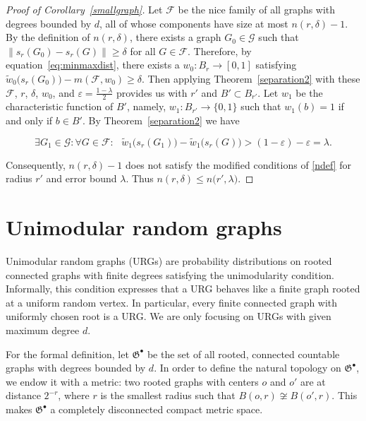 \documentclass[12pt,a4paper]{article}
\newcommand{\eps}{\varepsilon}
\newcommand{\F}{\mathcal{F}}
\newcommand{\G}{\mathcal{G}}
\renewcommand{\:}{\colon}
\begin{document}
\begin{proof}[Proof of Corollary~\ref{smallgraph}]
Let $\F$ be the nice family of all graphs with degrees bounded by $d$, all of whose components have size at most $n(r, \delta) - 1$. 
By the definition of $n(r, \delta)$, there exists a graph $G_0 \in \G$ such that $\big\| s_r(G_0)-s_r(G)\big\|\geq \delta$ for all $G\in \F$. 
Therefore, by equation~\eqref{eq:minmaxdist}, there exists a $w_0\: B_r \rightarrow [0, 1]$ satisfying $\tilde{w}_0\big(s_r(G_0)\big) - m(\F, w_0) \ge \delta$. 
Then applying Theorem~\ref{separation2} with these $\F$, $r$, $\delta$, $w_0$, and $\eps = \frac{1 - \lambda}{2}$ provides us with $r'$ and $B' \subset B_{r'}$. 
Let $w_1$ be the characteristic function of $B'$, namely, $w_1: B_{r'} \rightarrow \{0, 1\}$ such that $w_1(b) = 1$ if and only if $b \in B'$. 
By Theorem~\ref{separation2} we have

$$\exists G_1 \in \G \: \forall G \in \F \: \,\,\,\, \tilde{w}_1\big(s_r(G_1)\big) - \tilde{w}_1\big(s_r(G)\big) > (1 - \eps) - \eps = \lambda.$$ 

Consequently, $n(r, \delta) - 1$ does not satisfy the modified conditions of \eqref{ndef} for radius $r'$ and error bound $\lambda$. 
Thus $n(r, \delta) \le n\big(r', \lambda\big)$.
\end{proof}


\section{Unimodular random graphs}

Unimodular random graphs (URGs) are probability distributions on rooted connected graphs with finite degrees satisfying the unimodularity condition. 
Informally, this condition expresses that a URG behaves like a finite graph rooted at a uniform random vertex. 
In particular, every finite connected graph with uniformly chosen root is a URG. 
We are only focusing on URGs with given maximum degree $d$. 

For the formal definition, let $\mathfrak{G}^\bullet$ be the set of all rooted, connected countable graphs with degrees bounded by $d$. 
In order to define the natural topology on $\mathfrak{G}^\bullet$, we endow it with a metric: two rooted graphs with centers $o$ and $o'$ are at distance $2^{-r}$, where $r$ is the smallest radius such that $B(o, r)\not\cong B(o',r)$. 
This makes $\mathfrak{G}^\bullet$ a completely disconnected compact metric space. 
\end{document}
